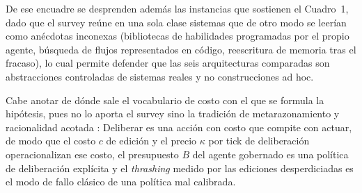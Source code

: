 De ese encuadre se desprenden además las instancias que sostienen el Cuadro~1, dado que el
survey reúne en una sola clase sistemas que de otro modo se leerían como anécdotas
inconexas (bibliotecas de habilidades programadas por el propio agente, búsqueda de flujos
representados en código, reescritura de memoria tras el fracaso), lo cual permite defender
que las seis arquitecturas comparadas son abstracciones controladas de sistemas reales y
no construcciones ad hoc.

Cabe anotar de dónde sale el vocabulario de costo con el que se formula la hipótesis, pues
no lo aporta el survey sino la tradición de metarazonamiento y racionalidad acotada
\parencite{zilberstein2011metareasoning}: Deliberar es una acción con costo que compite con
actuar, de modo que el costo $c$ de edición y el precio $\kappa$ por tick de deliberación
operacionalizan ese costo, el presupuesto $B$ del agente gobernado es una política de
deliberación explícita y el \emph{thrashing} medido por las ediciones desperdiciadas es el
modo de fallo clásico de una política mal calibrada.
